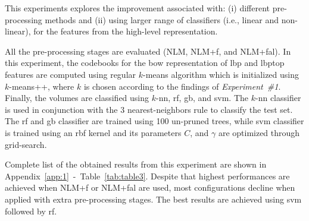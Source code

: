 This experiments explores the improvement associated with: (i) different pre-processing methods and (ii) using larger range of classifiers (i.e., linear and non-linear), for the features from the high-level representation.

All the pre-processing stages are evaluated (NLM, NLM+\acs{f}, and NLM+\acs{fal}).
In this experiment, the codebooks for the \ac{bow} representation of \ac{lbp} and \ac{lbptop} features are computed using regular $k$-means algorithm which is initialized using $k$-means++, where $k$ is chosen according to the findings of \emph{Experiment~\#1}.
Finally, the volumes are classified using $k$-\ac{nn}, \ac{rf}, \ac{gb}, and \ac{svm}.
The $k$-\ac{nn} classifier is used in conjunction with the 3 nearest-neighbors rule to classify the test set.
The \ac{rf} and \ac{gb} classifier are trained using 100 un-pruned trees, while \ac{svm} classifier is trained using an \ac{rbf} kernel and its parameters $C$, and $\gamma$ are optimized through grid-search.

Complete list of the obtained results from this experiment are shown in Appendix~\ref{app:1}~-~Table~\ref{tab:table3}.
Despite that highest performances are achieved when NLM+\acs{f} or NLM+\acs{fal} are used, most configurations decline when applied with extra pre-processing stages.
The best results are achieved using \ac{svm} followed by \ac{rf}.

